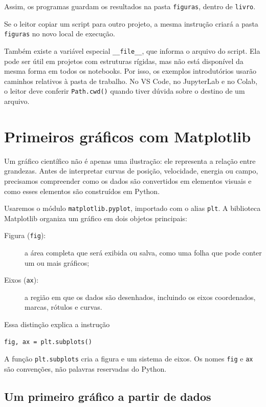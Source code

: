 Assim, os programas guardam os resultados na pasta \texttt{figuras}, dentro de \texttt{livro}.

Se o leitor copiar um script para outro projeto, a mesma instrução criará a pasta \texttt{figuras} no novo local de execução.

Também existe a variável especial \lstinline|__file__|, que informa o arquivo do script. Ela pode ser útil em projetos com estruturas rígidas, mas não está disponível da mesma forma em todos os notebooks. Por isso, os exemplos introdutórios usarão caminhos relativos à pasta de trabalho. No VS Code, no JupyterLab e no Colab, o leitor deve conferir \texttt{Path.cwd()} quando tiver dúvida sobre o destino de um arquivo.

\section{Primeiros gráficos com Matplotlib}
\label{sec:primeiros-graficos}

Um gráfico científico não é apenas uma ilustração: ele representa a relação entre grandezas. Antes de interpretar curvas de posição, velocidade, energia ou campo, precisamos compreender como os dados são convertidos em elementos visuais e como esses elementos são construídos em Python.

Usaremos o módulo \texttt{matplotlib.pyplot}, importado com o alias \texttt{plt}. A biblioteca Matplotlib organiza um gráfico em dois objetos principais:

\begin{description}
  \item[Figura (\texttt{fig}):] a área completa que será exibida ou salva, como uma folha que pode conter um ou mais gráficos;
  \item[Eixos (\texttt{ax}):] a região em que os dados são desenhados, incluindo os eixos coordenados, marcas, rótulos e curvas.
\end{description}

Essa distinção explica a instrução

\begin{lstlisting}
fig, ax = plt.subplots()
\end{lstlisting}

A função \texttt{plt.subplots} cria a figura e um sistema de eixos. Os nomes \texttt{fig} e \texttt{ax} são convenções, não palavras reservadas do Python.

\subsection{Um primeiro gráfico a partir de dados}

